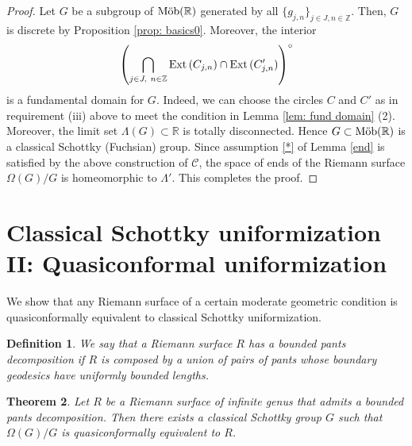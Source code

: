 \documentclass[12pt]{amsart}
\theoremstyle{plain}
\newtheorem{thm}{Theorem}[section]
\newtheorem{definition}[thm]{Definition}
\DeclareMathOperator{\Mob}{\mbox{\rm{M\"ob}}}
\begin{document}
\begin{proof}
Let $G$ be a subgroup of $\Mob(\mathbb R)$ generated by all 
$\{g_{j,n}\}_{j \in J, n \in \mathbb Z}$. Then, $G$ is discrete by Proposition
\ref{prop: basics0}. Moreover,
the interior
$$
\left(\bigcap_{j \in J,\ n \in \mathbb Z} {\rm Ext}\,(C_{j,n}) \cap {\rm Ext}\,(C'_{j,n})\right)^{\circ}
$$
is a fundamental domain for $G$. Indeed, 
we can choose the circles $C$ and $C'$ as in requirement (iii) above to meet 
the condition in Lemma \ref{lem: fund domain} (2).
Moreover, the limit set $\Lambda(G) \subset \mathbb R$ is totally
disconnected. Hence $G \subset \Mob(\mathbb R)$ is a classical Schottky (Fuchsian) group.
Since assumption \eqref{*} of Lemma \ref{end} is satisfied by 
the above construction of $\mathcal C$, the space of ends of the Riemann surface $\Omega(G)/G$ is homeomorphic to $\Lambda'$.
This completes the proof.
\end{proof}


\section{Classical Schottky uniformization II: Quasiconformal uniformization} \label{sec: uniformization II}
We show that any Riemann surface of a certain moderate geometric condition
is quasiconformally equivalent to classical Schottky uniformization.

\begin{definition}
{\rm
We say that a Riemann surface $R$ has a {\em bounded pants decomposition} if $R$ is composed by
a union of pairs of pants whose boundary geodesics have uniformly bounded lengths.
}
\end{definition}

\begin{thm}\label{thm: qc uniformization}
Let $R$ be a Riemann surface of infinite genus that admits
a bounded pants decomposition. 
Then there exists a classical Schottky group $G$
such that $\Omega(G)/G$ is quasiconformally equivalent to $R$.
\end{thm}
\end{document}

